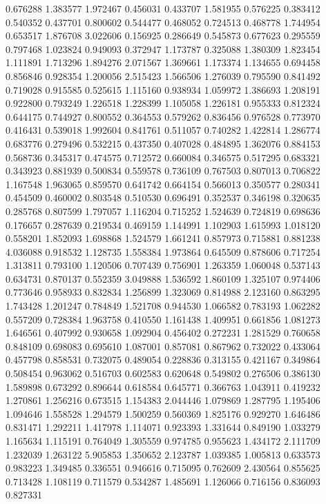 0.676288
1.383577
1.972467
0.456031
0.433707
1.581955
0.576225
0.383412
0.540352
0.437701
0.800602
0.544477
0.468052
0.724513
0.468778
1.744954
0.653517
1.876708
3.022606
0.156925
0.286649
0.545873
0.677623
0.295559
0.797468
1.023824
0.949093
0.372947
1.173787
0.325088
1.380309
1.823454
1.111891
1.713296
1.894276
2.071567
1.369661
1.173374
1.134655
0.694458
0.856846
0.928354
1.200056
2.515423
1.566506
1.276039
0.795590
0.841492
0.719028
0.915585
0.525615
1.115160
0.938934
1.059972
1.386693
1.208191
0.922800
0.793249
1.226518
1.228399
1.105058
1.226181
0.955333
0.812324
0.644175
0.744927
0.800552
0.364553
0.579262
0.836456
0.976528
0.773970
0.416431
0.539018
1.992604
0.841761
0.511057
0.740282
1.422814
1.286774
0.683776
0.279496
0.532215
0.437350
0.407028
0.484895
1.362076
0.884153
0.568736
0.345317
0.474575
0.712572
0.660084
0.346575
0.517295
0.683321
0.343923
0.881939
0.500834
0.559578
0.736109
0.767503
0.807013
0.706822
1.167548
1.963065
0.859570
0.641742
0.664154
0.566013
0.350577
0.280341
0.454509
0.460002
0.803548
0.510530
0.696491
0.352537
0.346198
0.320635
0.285768
0.807599
1.797057
1.116204
0.715252
1.524639
0.724819
0.698636
0.176657
0.287639
0.219534
0.469159
1.144991
1.102903
1.615993
1.018120
0.558201
1.852093
1.698868
1.524579
1.661241
0.857973
0.715881
0.881238
4.036088
0.918532
1.128735
1.558384
1.973864
0.645509
0.878606
0.717254
1.313811
0.793100
1.120506
0.707439
0.756901
1.263359
1.060048
0.537143
0.634731
0.870137
0.552359
3.049888
1.536592
1.860109
1.325107
0.974406
0.773646
0.958933
0.832834
1.256899
1.323069
0.814988
2.123160
0.863295
1.743428
1.201247
0.784849
1.521708
0.944530
1.066582
0.783193
1.062282
0.557209
0.728384
1.963758
0.410550
1.161438
1.409951
0.661856
1.081273
1.646561
0.407992
0.930658
1.092904
0.456402
0.272231
1.281529
0.760658
0.848109
0.698083
0.695610
1.087001
0.857081
0.867962
0.732022
0.433064
0.457798
0.858531
0.732075
0.489054
0.228836
0.313155
0.421167
0.349864
0.508454
0.963062
0.516703
0.602583
0.620648
0.549802
0.276506
0.386130
1.589898
0.673292
0.896644
0.618584
0.645771
0.366763
1.043911
0.419232
1.270861
1.256216
0.673515
1.154383
2.044446
1.079869
1.287795
1.195406
1.094646
1.558528
1.294579
1.500259
0.560369
1.825176
0.929270
1.646486
0.831471
1.292211
1.417978
1.114071
0.923393
1.331644
0.849190
1.033279
1.165634
1.115191
0.764049
1.305559
0.974785
0.955623
1.434172
2.111709
1.232039
1.263122
5.905853
1.350652
2.123787
1.039385
1.005813
0.633573
0.983223
1.349485
0.336551
0.946616
0.715095
0.762609
2.430564
0.855625
0.713428
1.108119
0.711579
0.534287
1.485691
1.126066
0.716156
0.836093
0.827331

